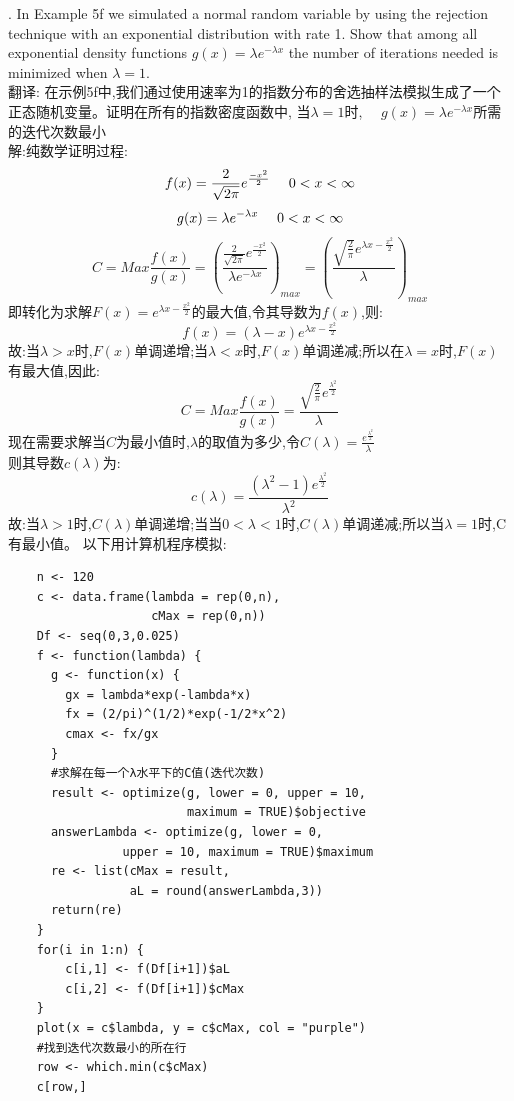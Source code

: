 \documentclass{book}
\begin{document}
. In Example 5f we simulated a normal random variable by using the rejection technique
with an exponential distribution with rate 1. Show that among all exponential density
functions $g(x) = \lambda e^{-\lambda x}$ the number of iterations needed is minimized when
$\lambda=1$. \\
翻译:
在示例5f中,我们通过使用速率为1的指数分布的舍选抽样法模拟生成了一个正态随机变量。证明在所有的指数密度函数中,
当$\lambda=1$时, \ \ $g(x) = \lambda e^{-\lambda x}$所需的迭代次数最小 \\
解:纯数学证明过程: \\
$$
  f(x) = \frac{2}{\sqrt{2\pi}}e^{\frac{-x^{2}}{2}}  \ \ \ \ 0 < x < \infty \\
$$
$$
  g(x) = \lambda e^{-\lambda x}  \ \ \ \ 0 < x < \infty \\
$$
$$
  C = Max \frac{f(x)}{g(x)} = (\frac{\frac{2}{\sqrt{2\pi}}e^{\frac{-x^{2}}{2}}}{\lambda e^{-\lambda x}})_{max}
  = (\frac{\sqrt{\frac{2}{\pi}} e^{\lambda x - \frac{x^{2}}{2}}}{\lambda})_{max}
$$
\noindent
即转化为求解$F(x) = e^{\lambda x - \frac{x^{2}}{2}}$的最大值,令其导数为$f(x)$,则:
$$
  f(x) = (\lambda - x)e^{\lambda x - \frac{x^{2}}{2}}
$$
故:当$\lambda > x$时,$F(x)$单调递增;当$\lambda < x$时,$F(x)$单调递减;所以在$\lambda = x$时,$F(x)$有最大值,因此:
$$
  C = Max \frac{f(x)}{g(x)}  = \frac{\sqrt{\frac{2}{\pi}} e^{\frac{\lambda ^{2}}{2}}}{\lambda}
$$
现在需要求解当$C$为最小值时,$\lambda$的取值为多少,令$C(\lambda) = \frac{e^{\frac{\lambda ^{2}}{2}}}{\lambda}$ \\
则其导数$c(\lambda)$为:
$$
  c(\lambda) = \frac{(\lambda^{2}-1)e^{\frac{\lambda^{2}}{2}}}{\lambda^{2}}
$$
故:当$\lambda > 1$时,$C(\lambda)$单调递增;当当$0 < \lambda < 1$时,$C(\lambda)$单调递减;所以当$\lambda = 1$时,C有最小值。
以下用计算机程序模拟:
\lstset{language = R}
\begin{lstlisting}
    n <- 120
    c <- data.frame(lambda = rep(0,n),
                    cMax = rep(0,n))
    Df <- seq(0,3,0.025)
    f <- function(lambda) {
      g <- function(x) {
        gx = lambda*exp(-lambda*x)
        fx = (2/pi)^(1/2)*exp(-1/2*x^2)
        cmax <- fx/gx
      }
      #求解在每一个λ水平下的C值(迭代次数)
      result <- optimize(g, lower = 0, upper = 10,
                         maximum = TRUE)$objective
      answerLambda <- optimize(g, lower = 0,
                upper = 10, maximum = TRUE)$maximum
      re <- list(cMax = result, 
                 aL = round(answerLambda,3))
      return(re)
    }
    for(i in 1:n) {
        c[i,1] <- f(Df[i+1])$aL
        c[i,2] <- f(Df[i+1])$cMax
    }
    plot(x = c$lambda, y = c$cMax, col = "purple")
    #找到迭代次数最小的所在行
    row <- which.min(c$cMax)
    c[row,]
\end{lstlisting}
\end{document}
